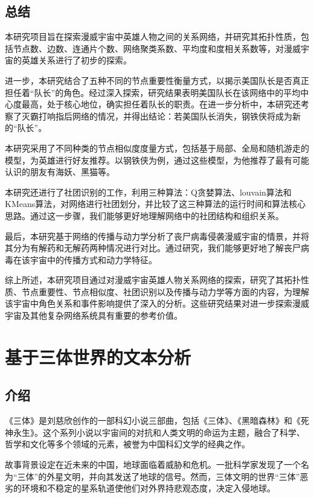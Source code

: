 \documentclass[12pt]{xjtureport}
\begin{document}
\subsection{总结}

本研究项目旨在探索漫威宇宙中英雄人物之间的关系网络，并研究其拓扑性质，包括节点数、边数、连通片个数、网络聚类系数、平均度和度相关系数等，对漫威宇宙的英雄关系进行了初步的探索。

进一步，本研究结合了五种不同的节点重要性衡量方式，以揭示美国队长是否真正担任着“队长”的角色。经过深入探索，研究结果表明美国队长在该网络中的平均中心度最高，处于核心地位，确实担任着队长的职责。在进一步分析中，本研究还考察了灭霸打响指后网络的情况，并得出结论：若美国队长消失，钢铁侠将成为新的“队长”。

本研究采用了不同种类的节点相似度度量方式，包括基于局部、全局和随机游走的模型，为英雄进行好友推荐。以钢铁侠为例，通过这些模型，为他推荐了最有可能认识的朋友有海妖、黑猫等。

本研究还进行了社团识别的工作，利用三种算法：Q贪婪算法、louvain算法和KMeans算法，对网络进行社团划分，并比较了这三种算法的运行时间和算法核心思路。通过这一步骤，我们能够更好地理解网络中的社团结构和组织关系。

最后，本研究基于网络的传播与动力学分析了丧尸病毒侵袭漫威宇宙的情景，并将其分为有解药和无解药两种情况进行对比。通过研究，我们能够更好地了解丧尸病毒在该宇宙中的传播方式和动力学特征。

综上所述，本研究项目通过对漫威宇宙英雄人物关系网络的探索，研究了其拓扑性质、节点重要性、节点相似度、社团识别以及传播与动力学等方面的内容，为理解该宇宙中角色关系和事件影响提供了深入的分析。这些研究结果对进一步探索漫威宇宙及其他复杂网络系统具有重要的参考价值。

\section{基于三体世界的文本分析}

\subsection{介绍}

《三体》是刘慈欣创作的一部科幻小说三部曲，包括《三体》、《黑暗森林》和《死神永生》。这个系列小说以宇宙间的对抗和人类文明的命运为主题，融合了科学、哲学和文化等多个领域的元素，被誉为中国科幻文学的经典之作。

故事背景设定在近未来的中国，地球面临着威胁和危机。一批科学家发现了一个名为“三体”的外星文明，并向其发送了地球的信号。然而，三体文明的世界“三体”恶劣的环境和不稳定的星系轨道使他们对外界持悲观态度，决定入侵地球。
\end{document}
